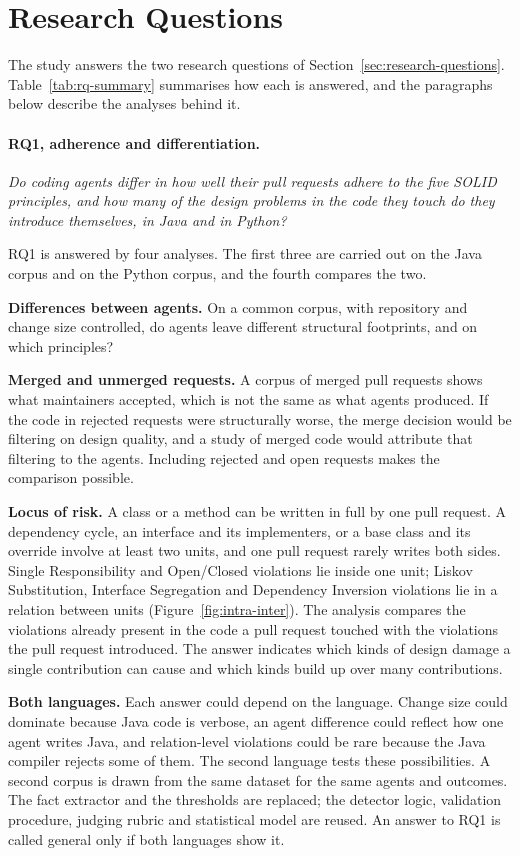 \section{Research Questions}
\label{sec:rqs}

The study answers the two research questions of Section~\ref{sec:research-questions}.
Table~\ref{tab:rq-summary} summarises how each is answered, and the paragraphs below describe the
analyses behind it.

\paragraph{RQ1, adherence and differentiation.}
\emph{Do coding agents differ in how well their pull requests adhere to the five SOLID principles,
and how many of the design problems in the code they touch do they introduce themselves, in Java
and in Python?}

RQ1 is answered by four analyses. The first three are carried out on the Java corpus and on the
Python corpus, and the fourth compares the two.

\textbf{Differences between agents.} On a common corpus, with repository and change size controlled,
do agents leave different structural footprints, and on which principles?

\textbf{Merged and unmerged requests.} A corpus of merged pull requests shows what maintainers
accepted, which is not the same as what agents produced. If the code in rejected requests were
structurally worse, the merge decision would be filtering on design quality, and a study of merged
code would attribute that filtering to the agents. Including rejected and open requests makes the
comparison possible.

\textbf{Locus of risk.} A class or a method can be written in full by one pull request. A dependency
cycle, an interface and its implementers, or a base class and its override involve at least two units,
and one pull request rarely writes both sides. Single Responsibility and Open/Closed violations lie
inside one unit; Liskov Substitution, Interface Segregation and Dependency Inversion violations lie
in a relation between units (Figure~\ref{fig:intra-inter}). The analysis compares the violations
already present in the code a pull request touched with the violations the pull request introduced.
The answer indicates which kinds of design damage a single contribution can cause and which kinds
build up over many contributions.

\textbf{Both languages.} Each answer could depend on the language. Change size could dominate
because Java code is verbose, an agent difference could reflect how one agent writes Java, and
relation-level violations could be rare because the Java compiler rejects some of them. The second
language tests these possibilities. A second corpus is drawn from the same dataset for the same
agents and outcomes. The fact extractor and the thresholds are replaced; the detector logic,
validation procedure, judging rubric and statistical model are reused. An answer to RQ1 is called
general only if both languages show it.

